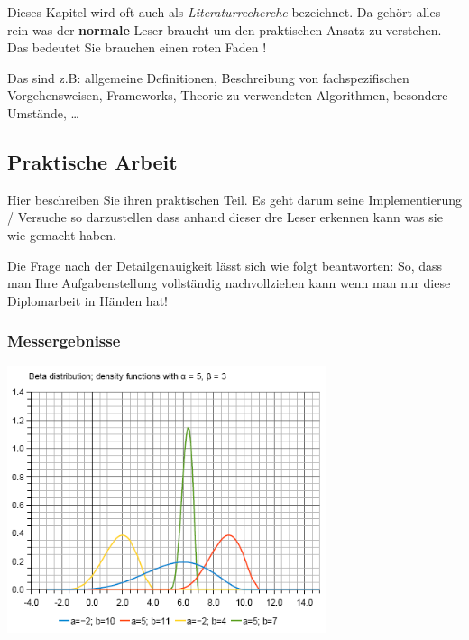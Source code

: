 \documentclass[
    headings=optiontotocandhead,%
    twoside,
    numbers=noenddot,%
    12pt, %
    titlepage, %
    parskip=full, %
    listof=leveldown, 
    numbers=noenddot, %
    a4paper,DIV=14,
    BCOR=15mm,
]{scrbook}
\let\origfigure=\figure
\let\endorigfigure=\endfigure
\renewenvironment{figure}[1][]{%
   \origfigure[H]
}{%
   \endorigfigure
}
\renewenvironment{quote}{\begin{customblockquote}\list{}{\rightmargin=0em\leftmargin=0em}%
\item\relax\color{blockquote-text}\ignorespaces}{\unskip\unskip\endlist\end{customblockquote}}
\newcommand*{\authormark}{}
\newcommand*{\textauthor}[1]{%
   \renewcommand{\authormark}{\translate{author}: #1}%
   \ignorespaces
}
\begin{document}
\textauthor{Joltawan Barodscheff}

Dieses Kapitel wird oft auch als \emph{Literaturrecherche} bezeichnet.
Da gehört alles rein was der \textbf{normale} Leser braucht um den
praktischen Ansatz zu verstehen. Das bedeutet Sie brauchen einen roten
Faden !

Das sind z.B: allgemeine Definitionen, Beschreibung von fachspezifischen
Vorgehensweisen, Frameworks, Theorie zu verwendeten Algorithmen,
besondere Umstände, \ldots{}

\hypertarget{praktische-arbeit}{%
\subsection{Praktische Arbeit}\label{praktische-arbeit}}

\begin{quote}
Hier beschreiben Sie ihren praktischen Teil. Es geht darum seine
Implementierung / Versuche so darzustellen dass anhand dieser dre Leser
erkennen kann was sie wie gemacht haben.
\end{quote}

Die Frage nach der Detailgenauigkeit lässt sich wie folgt beantworten:
So, dass man Ihre Aufgabenstellung vollständig nachvollziehen kann wenn
man nur diese Diplomarbeit in Händen hat!

\hypertarget{messergebnisse}{%
\subsubsection{Messergebnisse}\label{messergebnisse}}

\begin{figure}
\centering
\includegraphics[width=0.7\textwidth,height=\textheight]{img/graph.png}
\caption{Ein PNG Bild\label{fig:png_bild}}
\end{figure}
\end{document}
